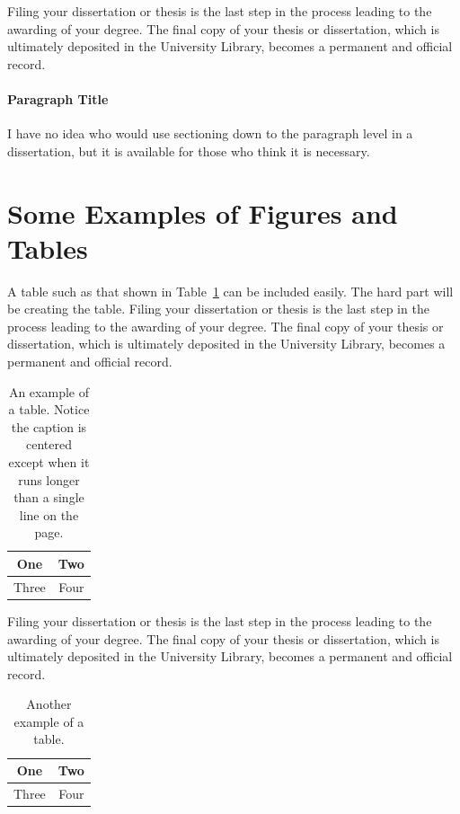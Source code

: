 Filing your dissertation or thesis is the last step in the process leading to the awarding of your degree. The final copy of your thesis or dissertation, which is ultimately deposited in the University Library, becomes a permanent and official record.

\paragraph{Paragraph Title}
%
I have no idea who would use sectioning down to the paragraph level in a dissertation, but it is available for those who think it is necessary.

\section{Some Examples of Figures and Tables}
%
A table such as that shown in Table~\ref{tab.example_1} can be included easily. The hard part will be creating the table. Filing your dissertation or thesis is the last step in the process leading to the awarding of your degree. The final copy of your thesis or dissertation, which is ultimately deposited in the University Library, becomes a permanent and official record.
%
\begin{table}[tbh]
\renewcommand{\arraystretch}{1.3}
\centering
\begin{tabular}{|c||c|}
\hline
One & Two\\
\hline
Three & Four\\
\hline
\end{tabular}
\caption[Example table]{An example of a table. Notice the caption is centered except when it runs longer than a single line on the page.}
\label{tab.example_1}
\end{table}

Filing your dissertation or thesis is the last step in the process leading to the awarding of your degree. The final copy of your thesis or dissertation, which is ultimately deposited in the University Library, becomes a permanent and official record.
%
\begin{table}[tbh]
\renewcommand{\arraystretch}{1.3}
\centering
\begin{tabular}{|c||c|}
\hline
One & Two\\
\hline
Three & Four\\
\hline
\end{tabular}
\caption[Another example table]{Another example of a table.}
\label{tab.example_2}
\end{table}

